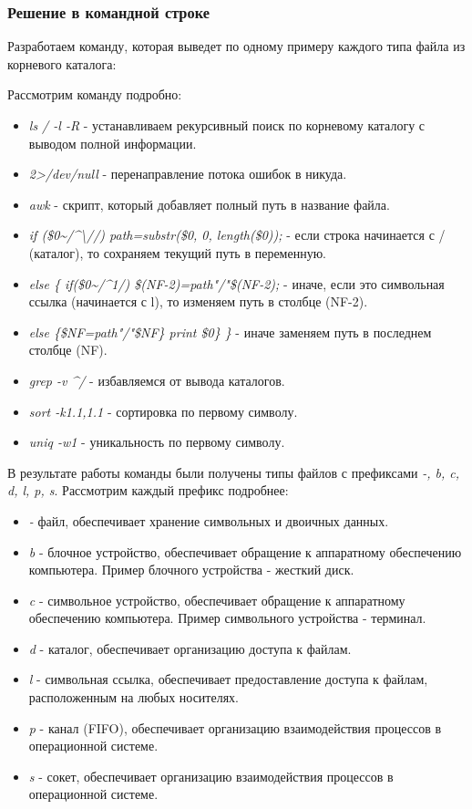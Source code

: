 \documentclass[14pt,a4paper,report]{report}
\begin{document}
\subsubsection{Решение в командной строке}

Разработаем команду, которая выведет по одному примеру каждого типа файла из корневого каталога:



Рассмотрим команду подробно:

\begin{itemize}
	\item \emph{ls / -l -R} - устанавливаем рекурсивный поиск по корневому каталогу с выводом полной информации.
	\item \emph{2>/dev/null} - перенаправление потока ошибок в никуда.
	\item \emph{awk} - скрипт, который добавляет полный путь в название файла.
	\item \emph{if (\$0\textasciitilde/\textasciicircum\textbackslash//) path=substr(\$0, 0, length(\$0)); } - если строка начинается с / (каталог), то сохраняем текущий путь в переменную.
	\item \emph{else \{ if(\$0\textasciitilde/\textasciicircum1/) \$(NF-2)=path"/"\$(NF-2);} - иначе, если это символьная ссылка (начинается с l), то изменяем путь в столбце (NF-2).
	\item \emph{else \{\$NF=path"/"\$NF\} print \$0\} \} } - иначе заменяем путь в последнем столбце (NF).
	\item \emph{grep -v \textasciicircum/} - избавляемся от вывода каталогов.
	\item \emph{sort -k1.1,1.1} - сортировка по первому символу.
	\item \emph{uniq -w1} - уникальность по первому символу.
\end{itemize}

\clearpage

В результате работы команды были получены типы файлов с префиксами \emph{-, b, c, d, l, p, s}. Рассмотрим каждый префикс подробнее:

\begin{itemize}
	\item \emph{-} файл, обеспечивает хранение символьных и двоичных данных.
	\item \emph{b} - блочное устройство, обеспечивает обращение к аппаратному обеспечению компьютера. Пример блочного устройства - жесткий диск.
	\item \emph{c} - символьное устройство, обеспечивает обращение к аппаратному обеспечению компьютера. Пример символьного устройства - терминал.
	\item \emph{d} - каталог, обеспечивает организацию доступа к файлам.
	\item \emph{l} - символьная ссылка, обеспечивает предоставление доступа к файлам, расположенным на любых носителях.
	\item \emph{p} - канал (FIFO), обеспечивает организацию взаимодействия процессов в операционной системе.
	\item \emph{s} - сокет, обеспечивает организацию взаимодействия процессов в операционной системе.
\end{itemize}
\end{document}
